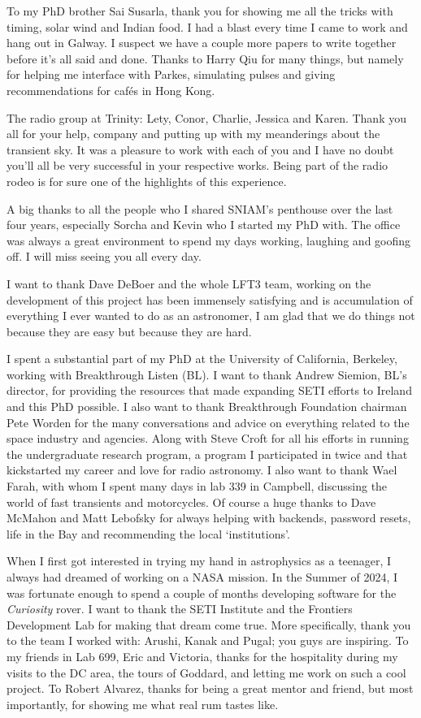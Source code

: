To my PhD brother Sai Susarla, thank you for showing me all the tricks with timing, solar wind and Indian food. I had a blast every time I came to work and hang out in Galway. I suspect we have a couple more papers to write together before it's all said and done. Thanks to Harry Qiu for many things, but namely for helping me interface with Parkes, simulating pulses and giving recommendations for cafés in Hong Kong. 

The radio group at Trinity: Lety, Conor, Charlie, Jessica and Karen. Thank you all for your help, company and putting up with my meanderings about the transient sky. It was a pleasure to work with each of you and I have no doubt you'll all be very successful in your respective works. Being part of the radio rodeo is for sure one of the highlights of this experience. 

A big thanks to all the people who I shared SNIAM's penthouse over the last four years, especially Sorcha and Kevin who I started my PhD with. The office was always a great environment to spend my days working, laughing and goofing off. I will miss seeing you all every day. 

I want to thank Dave DeBoer and the whole LFT3 team, working on the development of this project has been immensely satisfying and is accumulation of everything I ever wanted to do as an astronomer, I am glad that we do things not because they are easy but because they are hard. 

I spent a substantial part of my PhD at the University of California, Berkeley, working with Breakthrough Listen (BL). I want to thank Andrew Siemion, BL's director, for providing the resources that made expanding SETI efforts to Ireland and this PhD possible. I also want to thank Breakthrough Foundation chairman Pete Worden for the many conversations and advice on everything related to the space industry and agencies. Along with Steve Croft for all his efforts in running the undergraduate research program, a program I participated in twice and that kickstarted my career and love for radio astronomy. I also want to thank Wael Farah, with whom I spent many days in lab 339 in Campbell, discussing the world of fast transients and motorcycles. Of course a huge thanks to Dave McMahon and Matt Lebofsky for always helping with backends, password resets, life in the Bay and recommending the local `institutions'. 

When I first got interested in trying my hand in astrophysics as a teenager, I always had dreamed of working on a NASA mission. In the Summer of 2024, I was fortunate enough to spend a couple of months developing software for the \textit{Curiosity} rover. I want to thank the SETI Institute and the Frontiers Development Lab for making that dream come true. More specifically, thank you to the team I worked with: Arushi, Kanak and Pugal; you guys are inspiring. To my friends in Lab 699, Eric and Victoria, thanks for the hospitality during my visits to the DC area, the tours of Goddard, and letting me work on such a cool project. To Robert Alvarez, thanks for being a great mentor and friend, but most importantly, for showing me what real rum tastes like. 

